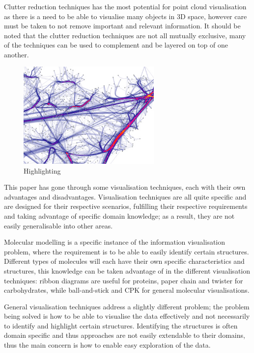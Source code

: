 Clutter reduction techniques has the most potential for point cloud
visualisation as there is a need to be able to visualise many objects in 3D
space, however care must be taken to not remove important and relevant
information. It should be noted that the clutter reduction techniques are not
all mutually exclusive, many of the techniques can be used to complement and be
layered on top of one another.

\begin{figure}[h!]
  \begin{center}
    \includegraphics[width=70mm]{graph_highlight}
  \end{center}
  \caption{Highlighting}
  \label{fig:graphhighlight}
\end{figure}



This paper has gone through some visualisation techniques, each with their own
advantages and disadvantages. Visualisation techniques are all quite specific
and are designed for their respective scenarios, fulfilling their respective
requirements and taking advantage of specific domain knowledge; as a result,
they are not easily generalisable into other areas.

Molecular modelling is a specific instance of the information visualisation
problem, where the requirement is to be able to easily identify certain
structures. Different types of molecules will each have their own specific
characteristics and structures, this knowledge can be taken advantage of in the
different visualisation techniques: ribbon diagrams are useful for proteins,
paper chain and twister for carbohydrates, while ball-and-stick and CPK for
general molecular visualisations.

General visualisation techniques address a slightly different problem; the
problem being solved is how to be able to visualise the data effectively and
not necessarily to identify and highlight certain structures. Identifying the
structures is often domain specific and thus approaches are not easily
extendable to their domains, thus the main concern is how to enable easy
exploration of the data.

